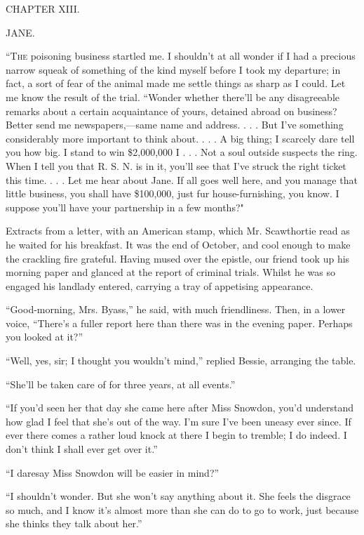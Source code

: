 {}

{CHAPTER XIII.}

{JANE.}

\textsc{``The} poisoning business startled me. I shouldn't at all wonder
if I had a precious narrow squeak of something of the kind myself before
I took my departure; in fact, a sort of fear of the animal made me
settle things as sharp as I could. Let me know the result of the trial.
``Wonder whether there'll be any disagreeable remarks about a certain
acquaintance of yours, detained abroad on business? Better send me
newspapers,---same name and address. . . . But I've something
considerably more important to think about. . . . A big thing; I
scarcely dare tell you how big. I stand to win \$2,000,000 I . . . Not a
soul outside suspects the ring. When I tell you that R. S. N. is in it,
you'll see that I've struck the right ticket this time. . . . Let me
hear about Jane. If all goes well here, and you manage that little
business, you shall have \$100,000, just fur {} house-furnishing, you
know. I suppose you'll have your partnership in a few months?"

Extracts from a letter, with an American stamp, which Mr. Scawthortie
read as he waited for his breakfast. It was the end of October, and cool
enough to make the crackling fire grateful. Having mused over the
epistle, our friend took up his morning paper and glanced at the report
of criminal trials. Whilst he was so engaged his landlady entered,
carrying a tray of appetising appearance.

``Good-morning, Mrs. Byass,'' he said, with much friendliness. Then, in
a lower voice, ``There's a fuller report here than there was in the
evening paper. Perhaps you looked at it?''

``Well, yes, sir; I thought you wouldn't mind,'' replied Bessie,
arranging the table.

``She'll be taken care of for three years, at all events.''

``If you'd seen her that day she came here after Miss Snowdon, you'd
understand how glad I feel that she's out of the way. I'm sure I've been
uneasy ever since. If ever there comes a rather loud knock at there I
begin to tremble; I do indeed. I don't think I shall ever get over it.''

{} ``I daresay Miss Snowdon will be easier in mind?''

``I shouldn't wonder. But she won't say anything about it. She feels the
disgrace so much, and I know it's almost more than she can do to go to
work, just because she thinks they talk about her.''

